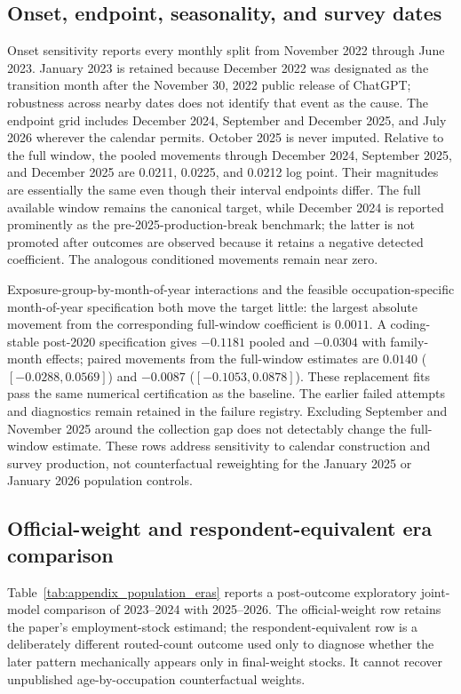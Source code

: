 

\subsection{Onset, endpoint, seasonality, and survey dates}

Onset sensitivity reports every monthly split from November 2022 through June 2023.  January 2023 is retained because December 2022 was designated as the transition month after the November 30, 2022 public release of ChatGPT; robustness across nearby dates does not identify that event as the cause.  The endpoint grid includes December 2024, September and December 2025, and July 2026 wherever the calendar permits.  October 2025 is never imputed.  Relative to the full window, the pooled movements through December 2024, September 2025, and December 2025 are 0.0211, 0.0225, and 0.0212 log point.  Their magnitudes are essentially the same even though their interval endpoints differ.  The full available window remains the canonical target, while December 2024 is reported prominently as the pre-2025-production-break benchmark; the latter is not promoted after outcomes are observed because it retains a negative detected coefficient.  The analogous conditioned movements remain near zero.



Exposure-group-by-month-of-year interactions and the feasible occupation-specific month-of-year specification both move the target little: the largest absolute movement from the corresponding full-window coefficient is $0.0011$.  A coding-stable post-2020 specification gives $-0.1181$ pooled and $-0.0304$ with family-month effects; paired movements from the full-window estimates are $0.0140$ ($[-0.0288,0.0569]$) and $-0.0087$ ($[-0.1053,0.0878]$).  These replacement fits pass the same numerical certification as the baseline.  The earlier failed attempts and diagnostics remain retained in the failure registry.  Excluding September and November 2025 around the collection gap does not detectably change the full-window estimate.  These rows address sensitivity to calendar construction and survey production, not counterfactual reweighting for the January 2025 or January 2026 population controls.

\subsection{Official-weight and respondent-equivalent era comparison}

Table~\ref{tab:appendix_population_eras} reports a post-outcome exploratory joint-model comparison of 2023--2024 with 2025--2026.  The official-weight row retains the paper's employment-stock estimand; the respondent-equivalent row is a deliberately different routed-count outcome used only to diagnose whether the later pattern mechanically appears only in final-weight stocks.  It cannot recover unpublished age-by-occupation counterfactual weights.


